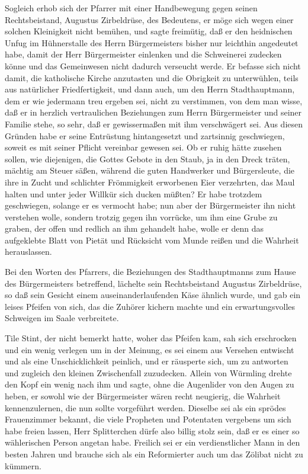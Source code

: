 Sogleich erhob sich der Pfarrer mit einer Handbewegung gegen seinen
Rechtsbeistand, Augustus Zirbeldrüse, des Bedeutens, er möge sich
wegen einer solchen Kleinigkeit nicht bemühen, und sagte freimütig,
daß er den heidnischen Unfug im Hühnerstalle des Herrn
Bürgermeisters bisher nur leichthin angedeutet habe, damit der Herr
Bürgermeister einlenken und die Schweinerei zudecken könne und das
Gemeinwesen nicht dadurch verseucht werde. Er befasse sich nicht
damit, die katholische Kirche anzutasten und die Obrigkeit zu
unterwühlen, teils aus natürlicher Friedfertigkeit, und dann auch,
um den Herrn Stadthauptmann, dem er wie jedermann treu ergeben sei,
nicht zu verstimmen, von dem man wisse, daß er in herzlich
vertraulichen Beziehungen zum Herrn Bürgermeister und seiner
Familie stehe, so sehr, daß er gewissermaßen mit ihm verschwägert
sei. Aus diesen Gründen habe er seine Entrüstung hintangesetzt und
zartsinnig geschwiegen, soweit es mit seiner Pflicht vereinbar
gewesen sei. Ob er ruhig hätte zusehen sollen, wie diejenigen, die
Gottes Gebote in den Staub, ja in den Dreck träten, mächtig am
Steuer säßen, während die guten Handwerker und Bürgersleute, die
ihre in Zucht und schlichter Frömmigkeit erworbenen Eier
verzehrten, das Maul halten und unter jeder Willkür sich ducken
müßten? Er habe trotzdem geschwiegen, solange er es vermocht habe;
nun aber der Bürgermeister ihn nicht verstehen wolle, sondern
trotzig gegen ihn vorrücke, um ihm eine Grube zu graben, der offen
und redlich an ihm gehandelt habe, wolle er denn das aufgeklebte
Blatt von Pietät und Rücksicht vom Munde reißen und die Wahrheit
herauslassen.

\pagenum{[26]}Bei den Worten des Pfarrers, die Beziehungen des
Stadthauptmanns zum Hause des Bürgermeisters betreffend, lächelte
sein Rechtsbeistand Augustus Zirbeldrüse, so daß sein Gesicht einem
auseinanderlaufenden Käse ähnlich wurde, und gab ein leises Pfeifen
von sich, das die Zuhörer kichern machte und ein erwartungsvolles
Schweigen im Saale verbreitete.

Tile Stint, der nicht bemerkt hatte, woher das Pfeifen kam, sah
sich erschrocken und ein wenig verlegen um in der Meinung, es sei
einem aus Versehen entwischt und als eine Unschicklichkeit
peinlich, und er räusperte sich, um zu antworten und zugleich den
kleinen Zwischenfall zuzudecken. Allein von Würmling drehte den
Kopf ein wenig nach ihm und sagte, ohne die Augenlider von den
Augen zu heben, er sowohl wie der Bürgermeister wären recht
neugierig, die Wahrheit kennenzulernen, die nun sollte vorgeführt
werden. Dieselbe sei als ein sprödes Frauenzimmer bekannt, die
viele Propheten und Potentaten vergebens um sich habe freien
lassen, Herr Splitterchen dürfe also billig stolz sein, daß er es
einer so wählerischen Person angetan habe. Freilich sei er ein
verdienstlicher Mann in den besten Jahren und brauche sich als ein
Reformierter auch um das Zölibat nicht zu kümmern.

